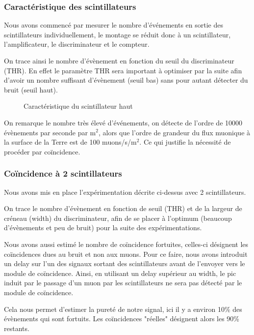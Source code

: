 \documentclass[a4paper,12pt,twoside]{article}
\begin{document}
\subsubsection{Caractéristique des scintillateurs}
Nous avons commencé par mesurer le nombre d’événements en sortie des scintillateurs individuellement, le montage se réduit donc à un scintillateur, l’amplificateur, le discriminateur et le compteur.

On trace ainsi le nombre d’évènement en fonction du seuil du discriminateur (THR). En effet le paramètre THR sera important à optimiser par la suite afin d’avoir un nombre suffisant d’évènement (seuil bas) sans pour autant détecter du bruit (seuil haut).

\begin{figure}[ht!]
    \centering
    \caption[Caractéristique du scintillateur haut]{Caractéristique du scintillateur haut}
\end{figure}

On remarque le nombre très élevé d’événements, on détecte de l’ordre de 10000 évènements par seconde par m$^2$, alors que l’ordre de grandeur du flux muonique à la surface de la Terre est de 100 muons/s/m$^2$. Ce qui justifie la nécessité de procéder par coïncidence.

\subsubsection{Coïncidence à 2 scintillateurs}
Nous avons mis en place l’expérimentation décrite ci-dessus avec 2 scintillateurs.

On trace le nombre d’évènement en fonction de seuil (THR) et de la largeur de créneau (width) du discriminateur, afin de se placer à l’optimum (beaucoup d’évènements et peu de bruit) pour la suite des expérimentations.

Nous avons aussi estimé le nombre de coïncidence fortuites, celles-ci désignent les coïncidences dues au bruit et non aux muons. Pour ce faire, nous avons introduit un delay sur l’un des signaux sortant des scintillateurs avant de l’envoyer vers le module de coïncidence. Ainsi, en utilisant un delay supérieur au width, le pic induit par le passage d’un muon par les scintillateurs ne sera pas détecté par le module de coïncidence.

Cela nous permet d’estimer la pureté de notre signal, ici il y a environ 10\% des évènements qui sont fortuits. Les coïncidences "réelles" désignent alors les 90\% restants.
\end{document}
